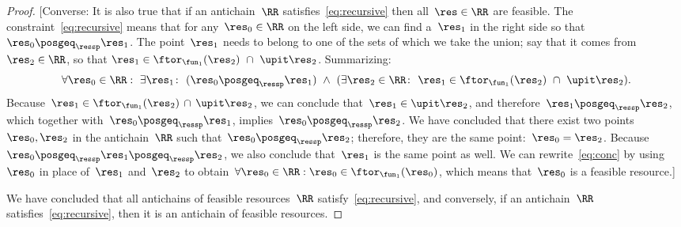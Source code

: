 \begin{proof}
    {[}Converse: It is also true that if an antichain~$\RR$ satisfies~\cref{eq:recursive}
    then all~$\res\in\RR$ are feasible. The constraint~\cref{eq:recursive}
    means that for any~$\res_{0}\in\RR$ on the left side, we can find
    a~$\res_{1}$ in the right side so that~$\res_{0}\posgeq_{\ressp}\res_{1}$.
    The point~$\res_{1}$ needs to belong to one of the sets of which
    we take the union; say that it comes from $\res_{2}\in\RR$, so
    that $\res_{1}\in\ftor_{\fun_{1}}(\res_{2})\ \cap\ \upit\res_{2}$.
    Summarizing:
        {
        \begin{equation}
            \forall\res_{0}\in\RR:\ \exists\res_{1}\colon\ (\res_{0}\posgeq_{\ressp}\res_{1})\ \wedge\ (\exists\res_{2}\in\RR\colon\ \res_{1}\in\ftor_{\fun_{1}}(\res_{2})\ \cap\ \upit\res_{2}).\label{eq:conc}
        \end{equation}
    }Because~$\res_{1}\in\ftor_{\fun_{1}}(\res_{2})\,\cap\,\upit\res_{2}$,
    we can conclude that~$\res_{1}\in\upit\res_{2}$, and therefore~$\res_{1}\posgeq_{\ressp}\res_{2}$,
    which together with~$\res_{0}\posgeq_{\ressp}\res_{1}$, implies~$\res_{0}\posgeq_{\ressp}\res_{2}$.
    We have concluded that there exist two points~$\res_{0},\res_{2}$
    in the antichain~$\RR$ such that~$\res_{0}\posgeq_{\ressp}\res_{2}$;
    therefore, they are the same point:~$\res_{0}=\res_{2}$. Because~$\res_{0}\posgeq_{\ressp}\res_{1}\posgeq_{\ressp}\res_{2}$,
    we also conclude that~$\res_{1}$ is the same point as well. We can
    rewrite~\cref{eq:conc} by using~$\res_{0}$ in place of~$\res_{1}$
    and~$\res_{2}$ to obtain~$\forall\res_{0}\in\RR:\res_{0}\in\ftor_{\fun_{1}}(\res_{0})$,
    which means that~$\res_{0}$ is a feasible resource.{]}

    We have concluded that all antichains of feasible resources~$\RR$
    satisfy~\cref{eq:recursive}, and conversely, if an antichain~$\RR$
    satisfies~\cref{eq:recursive}, then it is an antichain of feasible
    resources.


\end{proof}
